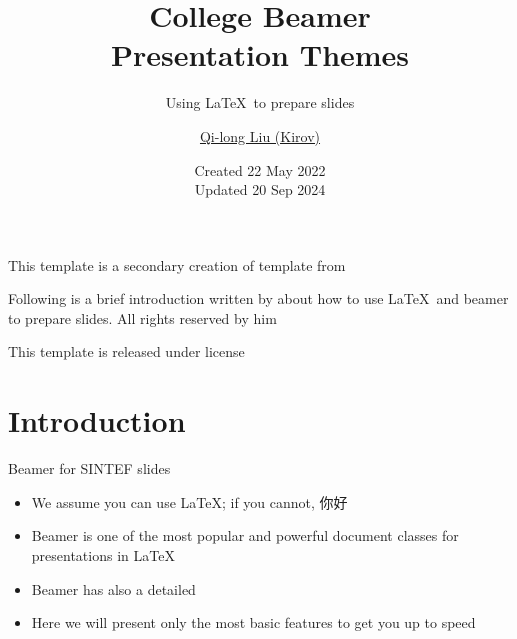 \documentclass{beamer}
\title{College Beamer\\ Presentation Themes}
\subtitle{Using \LaTeX\ to prepare slides}
\author{\href{mailto:qilong-kirov.liu@connect.polyu.hk}{Qi-long Liu (Kirov)}}
\date{Created 22 May 2022\\Updated 20 Sep 2024}
\begin{document}
    \maketitle

    \begin{frame}
        This template is a secondary creation of  template from  \vspace{\baselineskip}

        Following is a brief introduction written by  about how to use \LaTeX\ and beamer to prepare slides. All rights reserved by him\vspace{\baselineskip}

        This template is released under  license
    \end{frame}

    \section{Introduction}

    \begin{frame}{Beamer for SINTEF slides}{\thesection \, \secname}
        \begin{itemize}
            \item We assume you can use \LaTeX; if you cannot,  你好
            \item Beamer is one of the most popular and powerful document classes for presentations in \LaTeX
            \item Beamer has also a detailed 
            \item Here we will present only the most basic features to get you up to speed
        \end{itemize}
    \end{frame}
\end{document}
